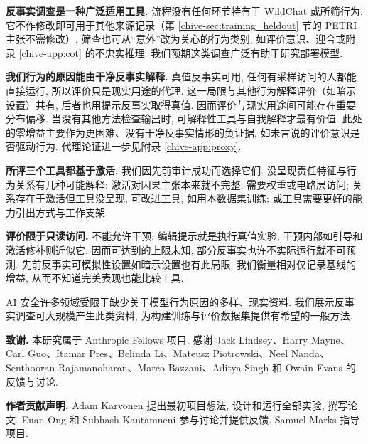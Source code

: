 \textbf{反事实调查是一种广泛适用工具.} 流程没有任何环节特有于 WildChat 或所筛行为. 它不作修改即可用于其他来源记录（第 \ref{chive-sec:training_heldout} 节的 PETRI 主张不需修改）, 筛查也可从“意外”改为关心的行为类别, 如评价意识、迎合或附录 \ref{chive-app:cot} 的不忠实推理. 我们预期这类调查广泛有助于研究部署模型.

\textbf{我们行为的原因能由干净反事实解释.} 真值反事实可用, 任何有采样访问的人都能直接运行, 所以评价只是现实用途的代理. 这一局限与其他行为解释评价（如暗示设置）共有, 后者也用提示反事实取得真值. 因而评价与现实用途间可能存在重要分布偏移. 当没有其他方法检查输出时, 可解释性工具与自我解释才最有价值. 此处的零增益主要作为更困难、没有干净反事实情形的负证据, 如未言说的评价意识是否驱动行为. 代理论证进一步见附录 \ref{chive-app:proxy}.

\textbf{所评三个工具都基于激活.} 我们因先前审计成功而选择它们. 没呈现责任特征与行为关系有几种可能解释: 激活对因果主张本来就不完整, 需要权重或电路层访问; 关系存在于激活但工具没呈现, 可改进工具, 如用本数据集训练; 或工具需要更好的能力引出方式与工作支架.

\textbf{评价限于只读访问.} 不能允许干预: 编辑提示就是执行真值实验, 干预内部如引导和激活修补则近似它. 因而可达到的上限未知, 部分反事实也许不实际运行就不可预测. 先前反事实可模拟性设置如暗示设置也有此局限. 我们衡量相对仅记录基线的增益, 从而不知道完美表现也能比较工具.

AI 安全许多领域受限于缺少关于模型行为原因的多样、现实资料. 我们展示反事实调查可大规模产生此类资料, 为构建训练与评价数据集提供有希望的一般方法.

\textbf{致谢.} 本研究属于 Anthropic Fellows 项目. 感谢 Jack Lindsey、Harry Mayne、Carl Guo、Itamar Pres、Belinda Li、Mateusz Piotrowski、Neel Nanda、Senthooran Rajamanoharan、Marco Bazzani、Aditya Singh 和 Owain Evans 的反馈与讨论.

\textbf{作者贡献声明.} Adam Karvonen 提出最初项目想法, 设计和运行全部实验, 撰写论文. Euan Ong 和 Subhash Kantamneni 参与讨论并提供反馈. Samuel Marks 指导项目.
